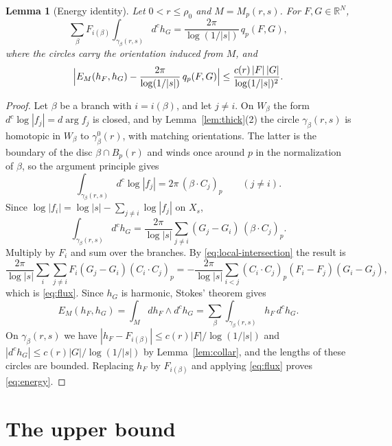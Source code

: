 \documentclass[11pt]{amsart}
\newtheorem{lemma}[theorem]{Lemma}
\theoremstyle{definition}
\theoremstyle{remark}
\newcommand{\RR}{\mathbb R}
\newcommand{\dc}{d^c}
\begin{document}
\begin{lemma}[Energy identity]\label{lem:energy}
Let $0<r\le\rho_0$ and $M=M_p(r,s)$. For $F,G\in\RR^N$,
\begin{equation}\label{eq:flux}
 \sum_\beta F_{i(\beta)}\int_{\gamma_\beta(r,s)}\dc h_G
 =\frac{2\pi}{\log(1/|s|)}\,q_p(F,G),
\end{equation}
where the circles carry the orientation induced from $M$, and
\begin{equation}\label{eq:energy}
 \Bigl|E_M(h_F,h_G)-\frac{2\pi}{\log(1/|s|)}\,q_p(F,G)\Bigr|
 \le\frac{c(r)\,|F|\,|G|}{\log(1/|s|)^2} .
\end{equation}
\end{lemma}
\begin{proof}
Let $\beta$ be a branch with $i=i(\beta)$, and let $j\ne i$. On
$W_\beta$ the form $\dc\log|f_j|=d\arg f_j$ is closed, and by
Lemma~\ref{lem:thick}(2) the circle $\gamma_\beta(r,s)$ is homotopic in
$W_\beta$ to $\gamma^0_\beta(r)$, with matching orientations. The latter
is the boundary of the disc $\beta\cap B_p(r)$ and winds once around $p$
in the normalization of $\beta$, so the argument principle gives
\[
 \int_{\gamma_\beta(r,s)}\dc\log|f_j|=2\pi\,(\beta\cdot C_j)_p
 \qquad(j\ne i).
\]
Since $\log|f_i|=\log|s|-\sum_{j\ne i}\log|f_j|$ on $X_s$,
\[
 \int_{\gamma_\beta(r,s)}\dc h_G
 =\frac{2\pi}{\log|s|}\sum_{j\ne i}(G_j-G_i)\,(\beta\cdot C_j)_p .
\]
Multiply by $F_i$ and sum over the branches. By
\eqref{eq:local-intersection} the result is
\[
 \frac{2\pi}{\log|s|}\sum_{i}\sum_{j\ne i}F_i(G_j-G_i)(C_i\cdot C_j)_p
 =-\frac{2\pi}{\log|s|}\sum_{i<j}(C_i\cdot C_j)_p(F_i-F_j)(G_i-G_j),
\]
which is \eqref{eq:flux}. Since $h_G$ is harmonic, Stokes' theorem gives
\[
 E_M(h_F,h_G)=\int_Mdh_F\wedge\dc h_G
 =\sum_\beta\int_{\gamma_\beta(r,s)}h_F\,\dc h_G .
\]
On $\gamma_\beta(r,s)$ we have $|h_F-F_{i(\beta)}|\le c(r)|F|/\log(1/|s|)$
and $|\dc h_G|\le c(r)|G|/\log(1/|s|)$ by Lemma~\ref{lem:collar}, and the
lengths of these circles are bounded. Replacing $h_F$ by $F_{i(\beta)}$
and applying \eqref{eq:flux} proves \eqref{eq:energy}.
\end{proof}

\section{The upper bound}\label{sec:upper}
\end{document}
